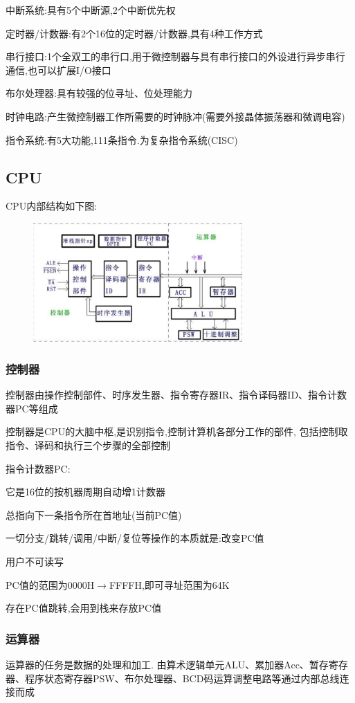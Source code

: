 \documentclass[12pt,a4paper,oneside]{ctexart}
\begin{document}
中断系统:具有5个中断源,2个中断优先权

定时器/计数器:有2个16位的定时器/计数器,具有4种工作方式

串行接口:1个全双工的串行口,用于微控制器与具有串行接口的外设进行异步串行通信,也可以扩展I/O接口

布尔处理器:具有较强的位寻址、位处理能力

时钟电路:产生微控制器工作所需要的时钟脉冲(需要外接晶体振荡器和微调电容)

指令系统:有5大功能,111条指令.为复杂指令系统(CISC)

\subsection{CPU}
CPU内部结构如下图:
\begin{figure}[H]
    \centering
    \includegraphics[width=8cm]{photos/CPU结构图.png}
\end{figure}
\subsubsection{控制器}
控制器由操作控制部件、时序发生器、指令寄存器IR、指令译码器ID、指令计数器PC等组成

控制器是CPU的大脑中枢,是识别指令,控制计算机各部分工作的部件,
包括控制取指令、译码和执行三个步骤的全部控制

指令计数器PC:

它是16位的按机器周期自动增1计数器

总指向下一条指令所在首地址(当前PC值)

一切分支/跳转/调用/中断/复位等操作的本质就是:改变PC值

用户不可读写

PC值的范围为0000H$\to$FFFFH,即可寻址范围为64K

存在PC值跳转,会用到栈来存放PC值

\subsubsection{运算器}
运算器的任务是数据的处理和加工.
由算术逻辑单元ALU、累加器Acc、暂存寄存器、程序状态寄存器PSW、布尔处理器、BCD码运算调整电路等通过内部总线连接而成
\end{document}
